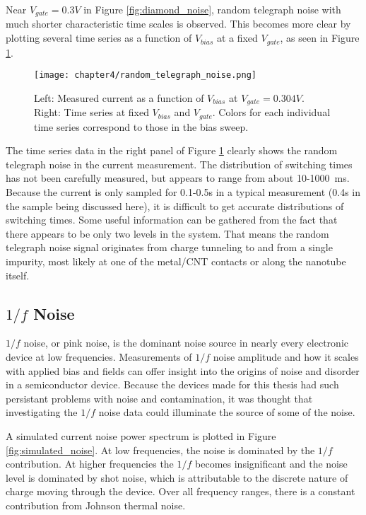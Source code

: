 Near $V_{gate} = 0.3V$ in Figure \ref{fig:diamond_noise}, random telegraph noise with much shorter characteristic time scales is observed. This becomes more clear by plotting several time series as a function of $V_{bias}$ at a fixed $V_{gate}$, as seen in Figure \ref{fig:rts_bias}.

\begin{figure}
    \centering
    \texttt{[image: chapter4/random\_telegraph\_noise.png]}
    \caption{Left: Measured current as a function of $V_{bias}$ at $V_{gate} = 0.304V$. Right: Time series at fixed $V_{bias}$ and $V_{gate}$. Colors for each individual time series correspond to those in the bias sweep.}
    \label{fig:rts_bias}
\end{figure}

The time series data in the right panel of Figure \ref{fig:rts_bias} clearly shows the random telegraph noise in the current measurement. The distribution of switching times has not been carefully measured, but appears to range from about 10-\SI{1000}{\milli\second}. Because the current is only sampled for 0.1-0.5s in a typical measurement (0.4s in the sample being discussed here), it is difficult to get accurate distributions of switching times. Some useful information can be gathered from the fact that there appears to be only two levels in the system. That means the random telegraph noise signal originates from charge tunneling to and from a single impurity, most likely at one of the metal/CNT contacts or along the nanotube itself.

\subsection{$1/f$ Noise}

$1/f$ noise, or pink noise, is the dominant noise source in nearly every electronic device at low frequencies. Measurements of $1/f$ noise amplitude and how it scales with applied bias and fields can offer insight into the origins of noise and disorder in a semiconductor device. Because the devices made for this thesis had such persistant problems with noise and contamination, it was thought that investigating the $1/f$ noise data could illuminate the source of some of the noise.

A simulated current noise power spectrum is plotted in Figure \ref{fig:simulated_noise}. At low frequencies, the noise is dominated by the $1/f$ contribution. At higher frequencies the $1/f$ becomes insignificant and the noise level is dominated by shot noise, which is attributable to the discrete nature of charge moving through the device. Over all frequency ranges, there is a constant contribution from Johnson thermal noise.

